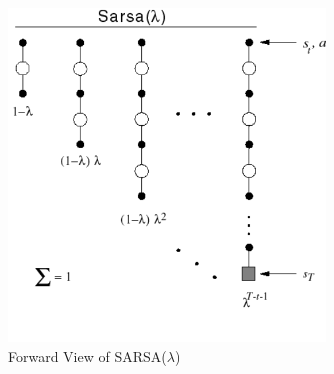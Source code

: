 \begin{figure}[H]
  \centering
  \includegraphics[width=0.75\textwidth]{figures/fv-srasa.png}
  \caption{Forward View of SARSA(\(\lambda\))}
  \label{fig:fv-srasa}
\end{figure}

